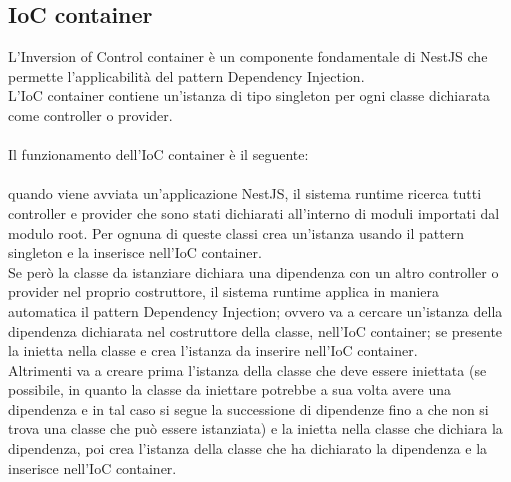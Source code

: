 \subsection{IoC container}
L'Inversion of Control container è un componente fondamentale di NestJS che permette l'applicabilità
del pattern Dependency Injection.
\\
L'IoC container contiene un'istanza di tipo singleton per ogni classe dichiarata come controller o provider.
\\\\
Il funzionamento dell'IoC container è il seguente:
\\\\
quando viene avviata un'applicazione NestJS, il sistema runtime ricerca tutti controller e provider che 
sono stati dichiarati all'interno di moduli importati dal modulo root. Per ognuna di queste classi crea un'istanza
usando il pattern singleton e la inserisce nell'IoC container. 
\\
Se però la classe da istanziare dichiara una dipendenza con un altro controller o provider nel proprio 
costruttore, il sistema runtime applica in maniera automatica il pattern Dependency Injection; ovvero
va a cercare un'istanza della dipendenza dichiarata nel costruttore della classe, nell'IoC container; se
presente la inietta nella classe e crea l'istanza da inserire nell'IoC container. 
\\
Altrimenti va a creare prima
l'istanza della classe che deve essere iniettata (se possibile, in quanto la
classe da iniettare potrebbe a sua volta avere una dipendenza e in tal caso si segue la successione di 
dipendenze fino a che non si trova una classe che può essere istanziata) e la inietta nella classe che dichiara
la dipendenza, poi crea l'istanza della classe che ha dichiarato la dipendenza e la inserisce nell'IoC container.
